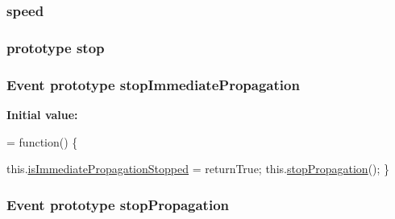 \hypertarget{jquery-1_810_82-vsdoc_8js_add98c90065e6563cba26ff6d2016c46c}{
\subsubsection[{speed}]{ speed}}\label{jquery-1_810_82-vsdoc_8js_add98c90065e6563cba26ff6d2016c46c}
\hypertarget{jquery-1_810_82-vsdoc_8js_a15a54c91540296e335556d3209094768}{
\subsubsection[{stop}]{ {\bf prototype} stop}}\label{jquery-1_810_82-vsdoc_8js_a15a54c91540296e335556d3209094768}
\hypertarget{jquery-1_810_82-vsdoc_8js_a41ea733f6d1de22b59b62cac632d0180}{
\subsubsection[{stop\-Immediate\-Propagation}]{ {\bf Event} {\bf prototype} stop\-Immediate\-Propagation}}\label{jquery-1_810_82-vsdoc_8js_a41ea733f6d1de22b59b62cac632d0180}
{\bfseries Initial value\-:}
\begin{DoxyCode}
= \textcolor{keyword}{function}() \{


        this.\hyperlink{jquery-1_810_82-vsdoc_8js_a5fe8157d3a55c7b444e8d97b9dcde6a8}{isImmediatePropagationStopped} = returnTrue;
        this.\hyperlink{jquery-1_810_82-vsdoc_8js_ad7254bed2a2157174df61645464ed6b7}{stopPropagation}();
    \}
\end{DoxyCode}
\hypertarget{jquery-1_810_82-vsdoc_8js_ad7254bed2a2157174df61645464ed6b7}{
\subsubsection[{stop\-Propagation}]{ {\bf Event} {\bf prototype} stop\-Propagation}}\label{jquery-1_810_82-vsdoc_8js_ad7254bed2a2157174df61645464ed6b7}
